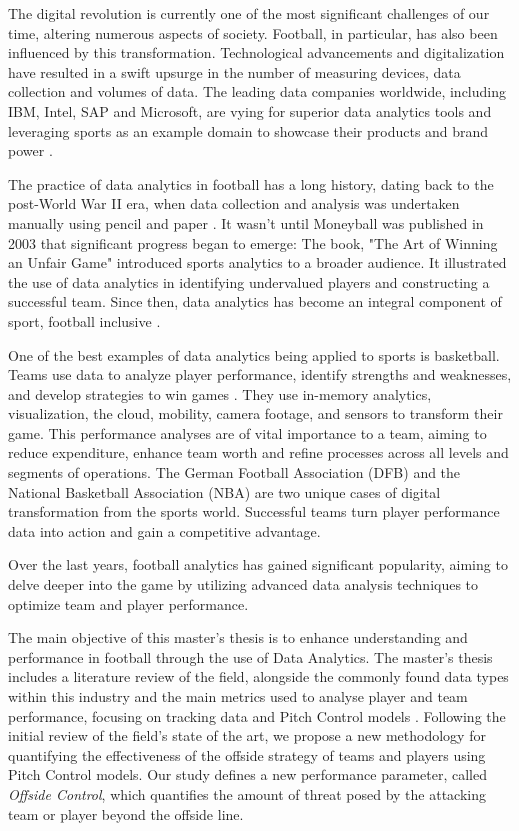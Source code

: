 \documentclass[
  twoside,nohyper]{book}
\begin{document}
The digital revolution is currently one of the most significant
challenges of our time, altering numerous aspects of society. Football,
in particular, has also been influenced by this transformation.
Technological advancements and digitalization have resulted in a swift
upsurge in the number of measuring devices, data collection and volumes
of data. The leading data companies worldwide, including IBM, Intel, SAP
and Microsoft, are vying for superior data analytics tools and
leveraging sports as an example domain to showcase their products and
brand power \citep{1}.

The practice of data analytics in football has a long history, dating
back to the post-World War II era, when data collection and analysis was
undertaken manually using pencil and paper \citep{1}. It wasn't until
Moneyball was published in 2003 that significant progress began to
emerge: The book, "The Art of Winning an Unfair Game" introduced
sports analytics to a broader audience. It illustrated the use of data
analytics in identifying undervalued players and constructing a
successful team. Since then, data analytics has become an integral
component of sport, football inclusive \citep{1}.

One of the best examples of data analytics being applied to sports is
basketball. Teams use data to analyze player performance, identify
strengths and weaknesses, and develop strategies to win games \citep{2}. They
use in-memory analytics, visualization, the cloud, mobility, camera
footage, and sensors to transform their game. This performance analyses
are of vital importance to a team, aiming to reduce expenditure, enhance
team worth and refine processes across all levels and segments of
operations. The German Football Association (DFB) and the National
Basketball Association (NBA) are two unique cases of digital
transformation from the sports world. Successful teams turn player
performance data into action and gain a competitive advantage.

Over the last years, football analytics has gained significant
popularity, aiming to delve deeper into the game by utilizing advanced
data analysis techniques to optimize team and player performance.

The main objective of this master's thesis is to enhance understanding and performance in football through the use of Data Analytics. The master's thesis includes a literature review of the field, alongside the commonly found data types within this
industry and the main metrics used to analyse player and team performance, focusing on tracking data and Pitch Control models \citep{Spearman}. Following the initial review of the field's state of the art, we propose a new methodology for quantifying the effectiveness of the offside strategy of teams and players using Pitch Control models. Our study defines a new performance parameter, called \emph{Offside Control}, which quantifies the amount of threat posed by the attacking team or player beyond the offside line.
\end{document}
